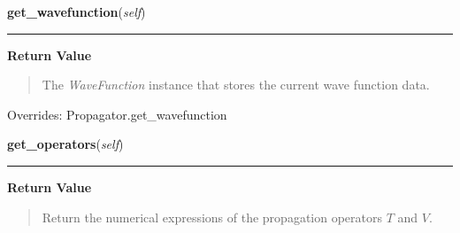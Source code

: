     \vspace{0.5ex}

\hspace{.8\funcindent}\begin{boxedminipage}{\funcwidth}

    \raggedright \textbf{get\_wavefunction}(\textit{self})

    \vspace{-1.5ex}

    \rule{\textwidth}{0.5\fboxrule}
\setlength{\parskip}{2ex}
\setlength{\parskip}{1ex}
      \textbf{Return Value}
    \vspace{-1ex}

      \begin{quote}
      The \textit{WaveFunction} instance that stores the current
      wave function data.

      \end{quote}

      Overrides: Propagator.get\_wavefunction

    \end{boxedminipage}

    \label{FourierPropagator:FourierPropagator:get_operators}

    \vspace{0.5ex}

\hspace{.8\funcindent}\begin{boxedminipage}{\funcwidth}

    \raggedright \textbf{get\_operators}(\textit{self})

    \vspace{-1.5ex}

    \rule{\textwidth}{0.5\fboxrule}
\setlength{\parskip}{2ex}
\setlength{\parskip}{1ex}
      \textbf{Return Value}
    \vspace{-1ex}

      \begin{quote}
      Return the numerical expressions of the propagation operators $T$
      and $V$.

      \end{quote}

    \end{boxedminipage}

    \vspace{0.5ex}

